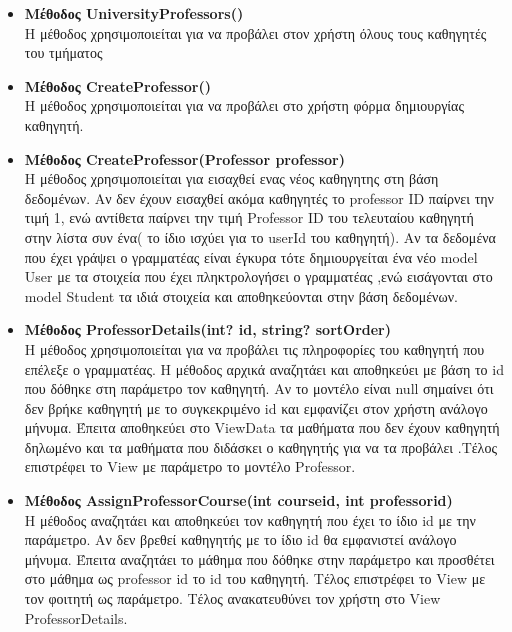 \documentclass[12pt]{article}
\begin{document}
\begin{itemize}
	\item \textbf{Μέθοδος UniversityProfessors()}\\
	Η μέθοδος χρησιμοποιείται για να προβάλει στον χρήστη όλους τους καθηγητές του τμήματος
	
	\item \textbf{Μέθοδος CreateProfessor()}\\
	Η μέθοδος χρησιμοποιείται για να προβάλει στο χρήστη φόρμα δημιουργίας καθηγητή.
			
	\item \textbf{Μέθοδος CreateProfessor(Professor professor)}\\
	Η μέθοδος χρησιμοποιείται για εισαχθεί ενας νέος καθηγητης στη βάση δεδομένων. Αν δεν έχουν εισαχθεί ακόμα καθηγητές το  professor ID παίρνει την τιμή 1, ενώ αντίθετα παίρνει την τιμή Professor ID του τελευταίου καθηγητή στην λίστα συν ένα( το ίδιο ισχύει για το userId του καθηγητή). Αν τα δεδομένα που έχει γράψει ο γραμματέας είναι έγκυρα τότε δημιουργείται ένα νέο model User με τα στοιχεία που έχει πληκτρολογήσει ο γραμματέας ,ενώ εισάγονται στο model Student τα ιδιά στοιχεία και αποθηκεύονται στην βάση δεδομένων.


	\item \textbf{Μέθοδος ProfessorDetails(int? id, string? sortOrder)}\\
	Η μέθοδος χρησιμοποιείται για να προβάλει τις πληροφορίες του καθηγητή που επέλεξε ο γραμματέας. Η μέθοδος αρχικά αναζητάει και αποθηκεύει με βάση το id που δόθηκε στη παράμετρο τον καθηγητή. Αν το μοντέλο είναι null σημαίνει ότι δεν βρήκε καθηγητή με το συγκεκριμένο id και εμφανίζει στον χρήστη ανάλογο μήνυμα. Έπειτα αποθηκεύει στο ViewData τα  μαθήματα που δεν έχουν καθηγητή δηλωμένο και τα μαθήματα που διδάσκει ο καθηγητής  για να τα προβάλει .Τέλος επιστρέφει το View με παράμετρο το μοντέλο Professor.
	
	\item \textbf{Μέθοδος AssignProfessorCourse(int courseid, int professorid)}\\
	Η μέθοδος αναζητάει και αποθηκεύει τον καθηγητή που έχει το ίδιο id με την παράμετρο. Αν δεν βρεθεί καθηγητής με το ίδιο id θα εμφανιστεί ανάλογο μήνυμα. Έπειτα αναζητάει το μάθημα που δόθηκε στην παράμετρο και προσθέτει στο μάθημα ως professor id το id του καθηγητή. Τέλος επιστρέφει το View με τον φοιτητή ως παράμετρο. Τέλος ανακατευθύνει τον χρήστη στο View ProfessorDetails.
	
\end{itemize}
	
\end{document}
